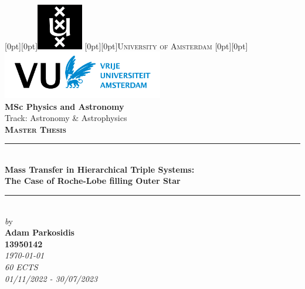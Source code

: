 \begin{titlepage}

\newcommand{\HRule}{\rule{\linewidth}{0.8mm}}
\center
 \vspace*{0.5cm}  %
\raisebox{0.05cm}[0pt][0pt]{\includegraphics[width=2.0cm]{Thesis/logos/UvA_logo.png}}
\raisebox{0.7cm}[0pt][0pt]{\textsc{\Huge University of Amsterdam}}
\raisebox{-1.85cm}[0pt][0pt]{\includegraphics[width=7.0cm]{Thesis/logos/VUlogo.png}}\\[2.0 cm]

\Large{\textbf{MSc Physics and Astronomy}}\\%
\Large{Track: Astronomy \& Astrophysics}\\[0.7cm] %
\textsc{\Large \textbf{Master Thesis}}\\[0.2cm]


\HRule \\[0.3cm]

{ \huge \bfseries Mass Transfer in Hierarchical Triple Systems:
}\\[0.8cm] %
{\Large \bfseries The Case of Roche-Lobe filling Outer Star} %

\HRule \\[0.7cm]
 

{\Large \emph by}\\[0.6cm]
{\Large \bfseries Adam Parkosidis\\ %
13950142}\\[0.4cm] %
{\large  \emph{\today}}\\ %
{\large  \emph{60 ECTS}}\\ %
{\large  \emph{01/11/2022 - 30/07/2023}}\\[1.8cm] %


\end{titlepage}
